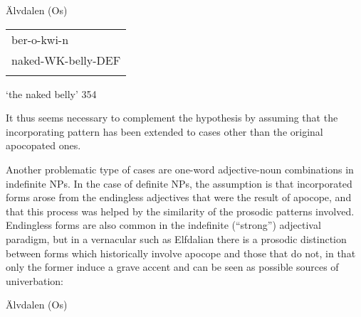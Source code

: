 \begin{listWWNumileveli}
\item {}

\begin{styleExample}
\label{bkm:Ref141171937}Älvdalen (Os)

\end{styleExample}

\end{listWWNumileveli}

\begin{tabular}{l}
\lsptoprule
ber-o-kwi-n\\
naked-WK-belly-DEF\\
\lspbottomrule
\end{tabular}

\begin{styleTranslation}
‘the naked belly’ 354

\end{styleTranslation}

\begin{styleBodyTextFirst}
It thus seems necessary to complement the hypothesis by assuming that the incorporating pattern has been extended to cases other than the original apocopated ones.

\end{styleBodyTextFirst}

\begin{styleBodytextC}
Another problematic type of cases are one-word adjective-noun combinations in indefinite NPs. In the case of definite NPs, the assumption is that incorporated forms arose from the endingless adjectives that were the result of apocope, and that this process was helped by the similarity of the prosodic patterns involved. Endingless forms are also common in the indefinite (“strong”) adjectival paradigm, but in a vernacular such as Elfdalian there is a prosodic distinction between forms which historically involve apocope and those that do not, in that only the former induce a grave accent and can be seen as possible sources of univerbation:

\end{styleBodytextC}

\begin{listWWNumileveli}
\item {}

\begin{styleExample}
Älvdalen (Os) 

\end{styleExample}

\end{listWWNumileveli}

